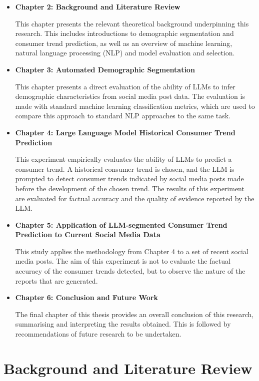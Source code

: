 \documentclass{report}
\begin{document}
\begin{itemize}
    \item \textbf{Chapter 2: Background and Literature Review}
    
    This chapter presents the relevant theoretical background underpinning this research. This includes introductions to demographic segmentation and consumer trend prediction, as well as an overview of machine learning, natural language processing (NLP) and model evaluation and selection.
    
    \item \textbf{Chapter 3: Automated Demographic Segmentation}
    
    This chapter presents a direct evaluation of the ability of LLMs to infer demographic characteristics from social media post data. The evaluation is made with standard machine learning classification metrics, which are used to compare this approach to standard NLP approaches to the same task.
    
    \item \textbf{Chapter 4: Large Language Model Historical Consumer Trend Prediction}
    
    This experiment empirically evaluates the ability of LLMs to predict a consumer trend. A historical consumer trend is chosen, and the LLM is prompted to detect consumer trends indicated by social media posts made before the development of the chosen trend. The results of this experiment are evaluated for factual accuracy and the quality of evidence reported by the LLM.
    
    \item \textbf{Chapter 5: Application of LLM-segmented Consumer Trend Prediction to Current Social Media Data}
    
    This study applies the methodology from Chapter 4 to a set of recent social media posts. The aim of this experiment is not to evaluate the factual accuracy of the consumer trends detected, but to observe the nature of the reports that are generated.
    
    
    \item \textbf{Chapter 6: Conclusion and Future Work}
    
    The final chapter of this thesis provides an overall conclusion of this research, summarising and interpreting the results obtained. This is followed by recommendations of future research to be undertaken.
\end{itemize}


\chapter{Background and Literature Review} \label{sec:lit-review}
\end{document}
